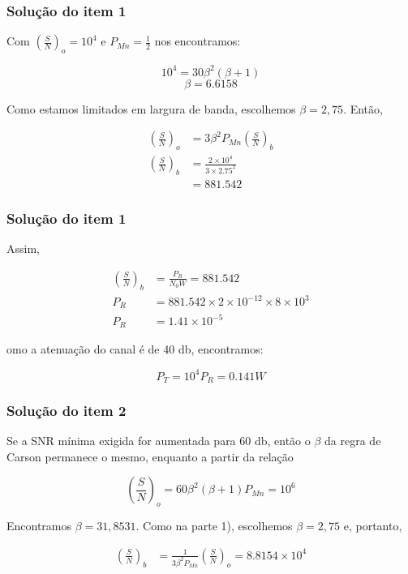 \documentclass[aspectratio=169,dvipsnames]{beamer}
\begin{document}
\begin{frame}
  \frametitle{Solução do item 1}

  Com $ \left(\frac{S}{N}\right)_o = 10^4$ e $P_{Mn} = \frac{1}{2}$ nos encontramos: 

$$10^4 = 30 \beta^2(\beta+1)$$
$$\beta = 6.6158$$

Como estamos limitados em largura de banda, escolhemos $\beta = 2,75$. Então,

\begin{align*}
\left(\frac{S}{N}\right)_o &= 3\beta^2P_{Mn}\left(\frac{S}{N}\right)_b\\
\left(\frac{S}{N}\right)_b &= \frac{2 \times 10^4}{3 \times 2.75^2} \\
&= 881.542
\end{align*}


\end{frame}


\begin{frame}
  \frametitle{Solução do item 1}

  Assim, 

\begin{align*}
\left(\frac{S}{N}\right)_b &= \frac{P_R}{N_0W} = 881.542\\
P_R &= 881.542 \times 2 \times 10^{-12} \times 8 \times 10^3 \\
P_R &= 1.41 \times 10^{-5}
\end{align*}

omo a atenuação do canal é de 40 db, encontramos: 

$$P_T = 10^4P_R = 0.141 W$$


\end{frame}

\begin{frame}
  \frametitle{Solução do item 2}

  Se a SNR mínima exigida for aumentada para 60 db, então o $\beta$ da regra de Carson permanece o
mesmo, enquanto a partir da relação

$$\left(\frac{S}{N}\right)_o = 60 \beta^2(\beta+1)P_{Mn}= 10^6$$

Encontramos $\beta = 31,8531$. Como na parte 1), escolhemos $\beta = 2,75$ e, portanto,

\begin{align*}
\left(\frac{S}{N}\right)_b &= \frac{1}{3\beta^2P_{Mn}}\left(\frac{S}{N}\right)_o = 8.8154 \times 10^4
\end{align*}

\end{frame}
\end{document}
